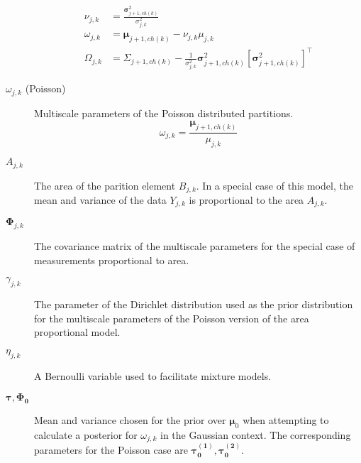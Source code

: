 \documentclass[a4paper,12pt]{article}
\theoremstyle{definition}
\begin{document}
\begin{description}
  \begin{align}
    \nu_{j,k} &= \frac{\boldsymbol{\sigma}^2_{j+1,ch(k)}}{\sigma^2_{j,k}} \\
    \omega_{j,k} &= \boldsymbol{\mu}_{j+1,ch(k)} - \nu_{j,k}\mu_{j,k} \\
    \Omega_{j,k} &= \Sigma_{j+1,ch(k)} - \frac{1}{\sigma^2_{j,k}}\boldsymbol{\sigma}^2_{j+1,ch(k)}\left[ \boldsymbol{\sigma}^2_{j+1,ch(k)} \right]^{\top}
  \end{align}
  \item[$\omega_{j,k}$ (Poisson)] Multiscale parameters of the Poisson distributed partitions.
  \begin{equation}
    \omega_{j,k} = \frac{\boldsymbol{\mu}_{j+1, ch(k)}}{\mu_{j,k}}
  \end{equation}
  \item[$A_{j,k}$] The area of the parition element $B_{j,k}$. In a special case of this model, the mean and variance of the data $Y_{j,k}$ is proportional to the area $A_{j,k}$.
  \item[$\boldsymbol{\Phi}_{j,k}$] The covariance matrix of the multiscale parameters for the special case of measurements proportional to area.
  \item[$\gamma_{j,k}$] The parameter of the Dirichlet distribution used as the prior distribution for the multiscale parameters of the Poisson version of the area proportional model.
  \item[$\eta_{j,k}$] A Bernoulli variable used to facilitate mixture models.
	\item[$\boldsymbol{\tau}, \boldsymbol{\Phi_0}$] Mean and variance chosen for the prior over $\boldsymbol{\mu}_0$ when attempting to calculate a posterior for $\omega_{j,k}$ in the Gaussian context. The corresponding parameters for the Poisson case are $\boldsymbol{\tau_0^{(1)}}, \boldsymbol{\tau_0^{(2)}}$.
\end{description}
\end{document}
